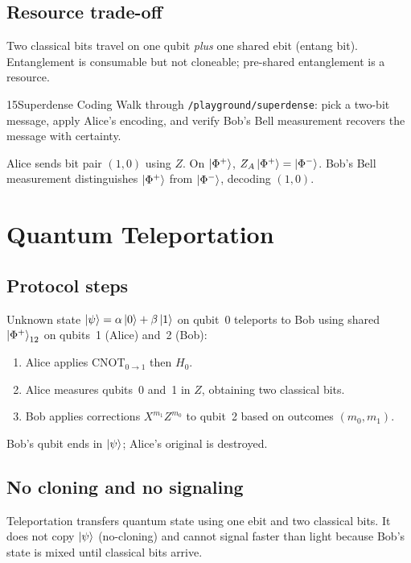 \subsection{Resource trade-off}

Two classical bits travel on one qubit \emph{plus} one shared ebit (entang bit). Entanglement is consumable but not cloneable; pre-shared entanglement is a resource.

\begin{labbox}{15}{Superdense Coding}
Walk through \texttt{/playground/superdense}: pick a two-bit message, apply Alice's encoding, and verify Bob's Bell measurement recovers the message with certainty.
\end{labbox}

\begin{example}
Alice sends bit pair $(1,0)$ using $Z$. On $\ket{\Phi^+}$, $Z_A\ket{\Phi^+}=\ket{\Phi^-}$. Bob's Bell measurement distinguishes $\ket{\Phi^+}$ from $\ket{\Phi^-}$, decoding $(1,0)$.
\end{example}

\section{Quantum Teleportation}
\label{sec:teleportation}

\subsection{Protocol steps}

Unknown state $\ket{\psi}=\alpha\ket{0}+\beta\ket{1}$ on qubit~0 teleports to Bob using shared $\ket{\Phi^+}_{12}$ on qubits~1 (Alice) and~2 (Bob):
\begin{enumerate}[noitemsep]
\item Alice applies CNOT$_{0\to 1}$ then $H_0$.
\item Alice measures qubits~0 and~1 in $Z$, obtaining two classical bits.
\item Bob applies corrections $X^{m_1}Z^{m_0}$ to qubit~2 based on outcomes $(m_0,m_1)$.
\end{enumerate}
Bob's qubit ends in $\ket{\psi}$; Alice's original is destroyed.

\subsection{No cloning and no signaling}

Teleportation transfers quantum state using one ebit and two classical bits. It does not copy $\ket{\psi}$ (no-cloning) and cannot signal faster than light because Bob's state is mixed until classical bits arrive.

